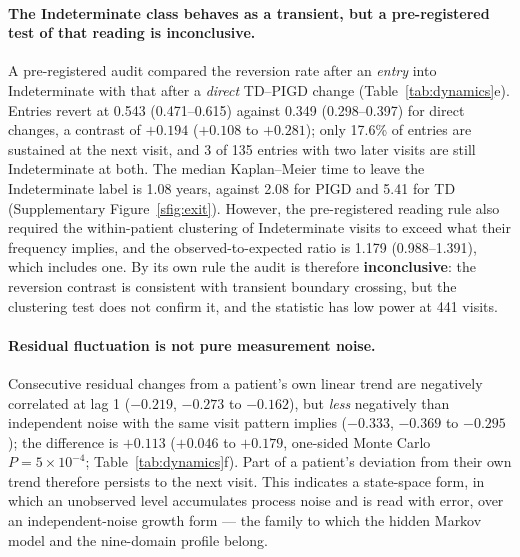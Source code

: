 \documentclass[11pt]{article}
\begin{document}
\paragraph{The Indeterminate class behaves as a transient, but a pre-registered
test of that reading is inconclusive.}
A pre-registered audit compared the reversion rate after an \emph{entry} into
Indeterminate with that after a \emph{direct} TD--PIGD change
(Table~\ref{tab:dynamics}e). Entries revert at 0.543 (0.471--0.615) against 0.349
(0.298--0.397) for direct changes, a contrast of $+0.194$ ($+0.108$ to
$+0.281$); only 17.6\% of entries are sustained at the next visit, and 3 of 135
entries with two later visits are still Indeterminate at both. The median
Kaplan--Meier time to leave the Indeterminate label is 1.08 years, against 2.08
for PIGD and 5.41 for TD (Supplementary Figure~\ref{sfig:exit}). However, the
pre-registered reading rule also required the within-patient clustering of
Indeterminate visits to exceed what their frequency implies, and the
observed-to-expected ratio is 1.179 (0.988--1.391), which includes one. By its
own rule the audit is therefore \textbf{inconclusive}: the reversion contrast is
consistent with transient boundary crossing, but the clustering test does not
confirm it, and the statistic has low power at 441 visits.

\paragraph{Residual fluctuation is not pure measurement noise.}
Consecutive residual changes from a patient's own linear trend are negatively
correlated at lag 1 ($-0.219$, $-0.273$ to $-0.162$), but \emph{less} negatively
than independent noise with the same visit pattern implies ($-0.333$, $-0.369$ to
$-0.295$); the difference is $+0.113$ ($+0.046$ to $+0.179$, one-sided Monte
Carlo $P = 5\times10^{-4}$; Table~\ref{tab:dynamics}f). Part of a patient's
deviation from their own trend therefore persists to the next visit. This
indicates a state-space form, in which an unobserved level accumulates process
noise and is read with error, over an independent-noise growth form --- the
family to which the hidden Markov model and the nine-domain profile belong.

\begin{table}[t]
\centering
\caption{The dynamics of the recorded label, measured without fitting a
predictive model. All intervals are patient-clustered bootstraps unless stated.
Panel (e) is a pre-registered audit whose reading rule required both the
reversion contrast and the clustering statistic to agree; they do not, so the
audit is inconclusive by its own rule.}
\label{tab:dynamics}
\footnotesize

\end{table}
\end{document}
